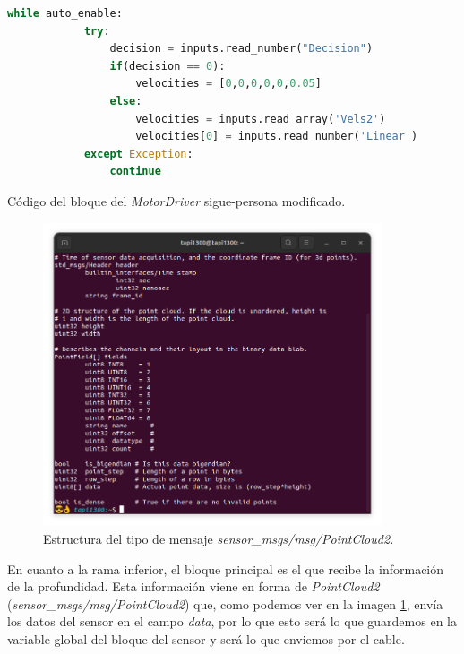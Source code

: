 \begin{code}[H]
    \begin{lstlisting}[language=python]
        while auto_enable:
            try:
                decision = inputs.read_number("Decision")
                if(decision == 0):
                    velocities = [0,0,0,0,0,0.05]
                else:
                    velocities = inputs.read_array('Vels2')
                    velocities[0] = inputs.read_number('Linear')
            except Exception:
                continue

    \end{lstlisting}
    \caption[Código bloque MotorDriver sigue-persona modificado]{Código del bloque del \textit{MotorDriver} sigue-persona modificado.}
    \label{cod:MotorDriver_FP_final}
\end{code}

\begin{figure} [H]
    \begin{center}
        \includegraphics[width=10cm]{figs/c5/PointCloud2_data.png}
    \end{center}
    \caption[Estructura mensaje PointCloud2]{Estructura del tipo de mensaje \textit{sensor\_msgs/msg/PointCloud2.}}
    \label{fig:PC2_struct}
\end{figure}


En cuanto a la rama inferior, el bloque principal es el que recibe la información de la profundidad. Esta información viene en forma
de \textit{PointCloud2} (\textit{sensor\_msgs/msg/PointCloud2}) que, como  podemos ver en la imagen \ref{fig:PC2_struct}, envía los datos del sensor en el
campo \textit{data}, por lo que esto será lo que guardemos en la variable global del bloque del sensor y será lo que enviemos por el cable.\\

